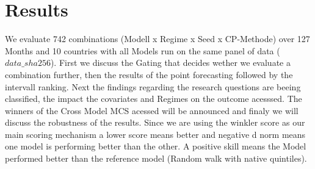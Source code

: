 %
\section{Results}
\label{sec:results}
We evaluate 742 combinations (Modell x Regime x Seed x CP-Methode) over 127 Months and 10 countries with all Models run on the same panel of data ($data\_sha256$). First we discuss the Gating that decides wether we evaluate a combination further, then the results of the point forecasting followed by the intervall ranking. Next the findings regarding the research questions are beeing classified, the impact the covariates and Regimes on the outcome acesssed. The winners of the Cross Model MCS acessed will be announced and finaly we will discuss the robustness of the results. Since we are using the winkler score as our main scoring mechanism a lower score means better and negative d norm means one model is performing better than the other. A positive skill means the Model performed better than the reference model (Random walk with native quintiles). 
%


